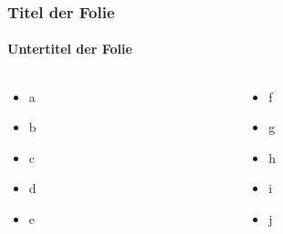 \begin{frame}
\frametitle{Titel der Folie}
\framesubtitle{Untertitel der Folie}

\begin{columns}
\begin{column}{0.495\textwidth}
\begin{itemize}
\item a
\item b
\item c
\item d
\item e
\end{itemize}
\end{column}
\begin{column}{0.495\textwidth}
\begin{itemize}
\item f
\item g
\item h
\item i
\item j
\end{itemize}
\end{column}
\end{columns}

\end{frame}


